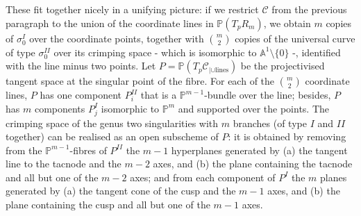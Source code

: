 \documentclass[11pt]{amsart}
\newcommand{\PP}{\mathbb P}
\newcommand{\Aaff}{\mathbb A}
\theoremstyle{plain}
\theoremstyle{definition}
\begin{document}
These fit together nicely in a unifying picture: if we restrict $\mathcal C$ from the previous paragraph to the union of the coordinate lines in $\PP(T_pR_m)$, we obtain $m$ copies of $\sigma_0^{I}$ over the coordinate points, together with $\binom{m}{2}$ copies of the universal curve of type $\sigma_0^{I\!I}$ over its crimping space - which is isomorphic to $\Aaff^1\setminus\{0\}$ -, identified with the line minus two points. Let $P=\PP(T_p\mathcal C_{|\cup\text{lines}})$ be the projectivised tangent space at the singular point of the fibre. For each of the $\binom{m}{2}$ coordinate lines, $P$ has one component $P^{I\!I}_i$ that is a $\PP^{m-1}$-bundle over the line; besides, $P$ has $m$ components $P^{I}_j$ isomorphic to $\PP^m$ and supported over the points. The crimping space of the genus two singularities with $m$ branches (of type $I$ and $I\!I$ together) can be realised as an open subscheme of $P$: it is obtained by removing from the $\PP^{m-1}$-fibres of $P^{I\!I}$ the $m-1$ hyperplanes generated by (a) the tangent line to the tacnode and the $m-2$ axes, and (b) the plane containing the tacnode and all but one of the $m-2$ axes; and from each component of $P^{I}$ the $m$ planes generated by (a) the tangent cone of the cusp and the $m-1$ axes, and (b) the plane containing the cusp and all but one of the $m-1$ axes.
\end{document}
